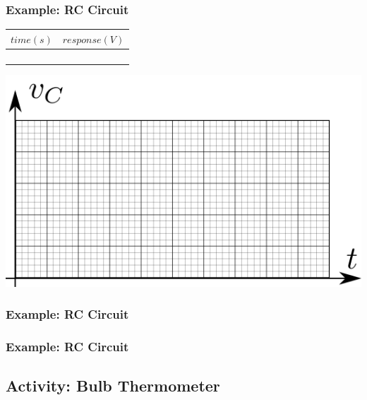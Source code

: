 \documentclass[fleqn]{beamer} %
\newcommand{\sectionIIsubsectionIIItitle}{Example: RC Circuit}
\newcommand{\sectionIIsubsectionIVtitle}{Activity: Bulb Thermometer}
\begin{document}
			\begin{frame}
				\frametitle{\sectionIIsubsectionIIItitle}

				\bigskip

				\begin{multicols}{2}

\renewcommand{\arraystretch}{1.5}
\begin{tabular}{|c|c|} \hline
$time (s)$&$response (V)$\\ \hline
&\\ \hline
&\\ \hline
&\\ \hline
&\\ \hline
\end{tabular}

\includegraphics[scale=0.5]{images/voltage_versus_time.png} 	
\end{multicols}



			\end{frame}

			\begin{frame}
				\frametitle{\sectionIIsubsectionIIItitle}

			\end{frame}

			\begin{frame}
			\frametitle{\sectionIIsubsectionIIItitle}





			\end{frame}

		\subsection{\sectionIIsubsectionIVtitle}\label{sectionIIsubsectionIV}
\end{document}
